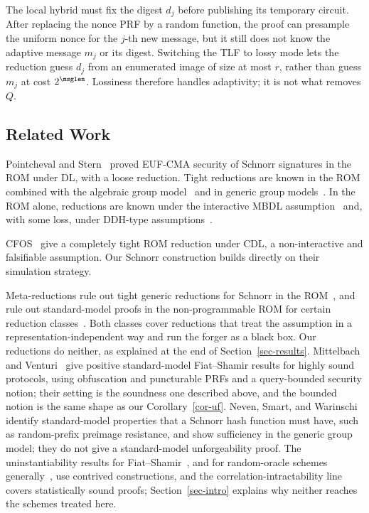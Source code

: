  The local hybrid must fix the digest $d_j$ before publishing its temporary circuit. After replacing the nonce PRF by a random function, the proof can presample the uniform nonce for the $j$-th new message, but it still does not know the adaptive message $m_j$ or its digest. Switching the TLF to lossy mode lets the reduction guess $d_j$ from an enumerated image of size at most $r$, rather than guess $m_j$ at cost $2^{\msglen}$. Lossiness therefore handles adaptivity; it is not what removes $Q$.

\subsection{Related Work} \label{sec-relwork}

 Pointcheval and Stern~\cite{EC:PoiSte96,JC:PoiSte00} proved EUF-CMA security of Schnorr signatures in the ROM under DL, with a loose reduction. Tight reductions are known in the ROM combined with the algebraic group model~\cite{EC:FucPloSeu20} and in generic group models~\cite{JMC:NevSmaWar09,EPRINT:Shoup23,C:CLMQ21}. In the ROM alone, reductions are known under the interactive MBDL assumption~\cite{INDOCRYPT:BelDai20} and, with some loss, under DDH-type assumptions~\cite{C:RotSeg21}.

CFOS~\cite{C:CFOS25} give a completely tight ROM reduction under CDL, a non-interactive and falsifiable assumption. Our Schnorr construction builds directly on their simulation strategy.

 Meta-reductions rule out tight generic reductions for Schnorr in the ROM~\cite{AC:PaiVer05,C:GarBhaLok08,EC:Seurin12,JC:FleJagSch19}, and rule out standard-model proofs in the non-programmable ROM for certain reduction classes~\cite{FukumitsuH21}. Both classes cover reductions that treat the assumption in a representation-independent way and run the forger as a black box. Our reductions do neither, as explained at the end of Section~\ref{sec-results}. Mittelbach and Venturi~\cite{DBLP:journals/tcs/MittelbachV18} give positive standard-model Fiat--Shamir results for highly sound protocols, using obfuscation and puncturable PRFs and a query-bounded security notion; their setting is the soundness one described above, and the bounded notion is the same shape as our Corollary~\ref{cor-uf}. Neven, Smart, and Warinschi~\cite{JMC:NevSmaWar09} identify standard-model properties that a Schnorr hash function must have, such as random-prefix preimage resistance, and show sufficiency in the generic group model; they do not give a standard-model unforgeability proof. The uninstantiability results for Fiat--Shamir~\cite{FOCS:GolKal03}, and for random-oracle schemes generally~\cite{JACM:CanGolHal04}, use contrived constructions, and the correlation-intractability line~\cite{EC:CCRR18,STOC:CCHLRRW19,C:PeiShi19} covers statistically sound proofs; Section~\ref{sec-intro} explains why neither reaches the schemes treated here.

